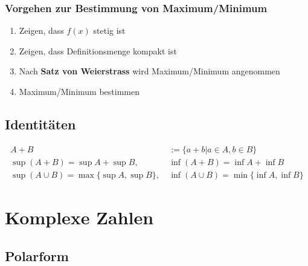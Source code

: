 \documentclass[11pt]{article}
\begin{document}
\subsubsection{Vorgehen zur Bestimmung von Maximum/Minimum}

\begin{enumerate}[noitemsep]
	\item Zeigen, dass $f(x)$ stetig ist
	\item Zeigen, dass Definitionsmenge kompakt ist
	\item Nach \textbf{Satz von Weierstrass} wird Maximum/Minimum angenommen
	\item Maximum/Minimum bestimmen
\end{enumerate}

\subsection{Identit{\"a}ten}

\begin{equation*}
\begin{split}
	A + B & := \{a + b | a \in A, b \in B\} \\
	\sup(A+B) = \sup A + \sup B,\ & \inf(A+B) = \inf A + \inf B \\
	\sup(A \cup B) = \max\{\sup A, \sup B\},\ & \inf(A \cup B) = \min\{\inf A, \inf B\}
\end{split}
\end{equation*}

\section{Komplexe Zahlen}

\subsection{Polarform}
\end{document}
